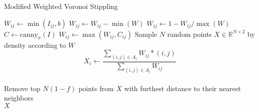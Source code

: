 \documentclass[runningheads]{llncs}
\begin{document}
\begin{algorithm}
  \caption{Modified Weighted Voronoi Stippling \cite{secord2002weighted}}
  \begin{algorithmic}[1]
    \State $W_{ij} \gets \min(I_{ij}, b)$
    \State $W_{ij} \gets W_{ij} - \min(W)$
    \State $W_{ij} \gets 1 - W_{ij} / \max(W)$
    \State $C \gets \text{canny}_{\sigma}(I)$ 
    \State $W_{ij} \gets \max(W_{ij}, C_{ij})$
    \State  Sample $N$ random points $X \in \mathbb{R}^{N \times 2}$ by density according to $W$
     
        \State \begin{equation}
          X_i \gets \frac{ \sum_{(i, j) \in A_i} W_{ij} * (i, j) }{\sum_{(i, j) \in A_i} W_{ij}}
        \end{equation}
    \EndFor \\
    \State Remove top $N(1-f)$ points from $X$ with furthest distance to their nearest neighbors \\
    \Return $X$
    \EndProcedure
  \end{algorithmic}
  \label{alg:voronoistipple}
\end{algorithm}

\end{document}
